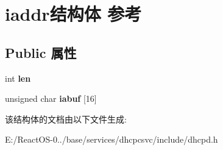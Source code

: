 \hypertarget{structiaddr}{}\section{iaddr结构体 参考}
\label{structiaddr}
\subsection*{Public 属性}
\begin{DoxyCompactItemize}
\item 
\mbox{\label{structiaddr_ad6b169a27bf472afe3dd658bd7c8c974}} 
int {\bfseries len}
\item 
\mbox{\label{structiaddr_ad6b803676a4496c5f588a0bfc7aeca76}} 
unsigned char {\bfseries iabuf} \mbox{[}16\mbox{]}
\end{DoxyCompactItemize}


该结构体的文档由以下文件生成\+:\begin{DoxyCompactItemize}
\item 
E\+:/\+React\+O\+S-\/0../base/services/dhcpcsvc/include/dhcpd.\+h\end{DoxyCompactItemize}
